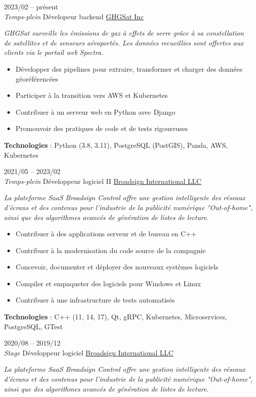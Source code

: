 \documentclass[9pt]{developercv2} %
\begin{document}
\begin{entrylist}
	\entry
	{2023/02 -- présent\\\emph{Temps-plein}}
	{Dévelopeur backend}
	{\href{https://ghgsat.com/fr/}{GHGSat Inc}}
	{
		\emph{
			GHGSat surveille les émissions de gaz à effets de serre grâce à sa constellation de satellites et de
			senseurs aéroportés. Les données recueillies sont offertes aux clients via le portail web Spectra.
		}

		\begin{itemize}
			\renewcommand{\labelitemi}{\raisebox{.45ex}{\rule{.6ex}{.6ex}}}
			\setlength\itemsep{-1pt}
			\item Développer des pipelines pour extraire, transformer et charger des données géoréférencées
			\item Participer à la transition vers AWS et Kubernetes
			\item Contribuer à un serveur web en Python avec Django
			\item Promouvoir des pratiques de code et de tests rigoureuses
		\end{itemize}

		\textbf{Technologies} : Python (3.8, 3.11), PostgreSQL (PostGIS), Panda, AWS, Kubernetes
	}
	\entry
	{2021/05 -- 2023/02\\\emph{Temps-plein}}
	{Développeur logiciel II}
	{\href{https://broadsign.com/}{Broadsign International LLC}}
	{
		\emph{
			La plateforme SaaS Broadsign Control offre une gestion intelligente des réseaux d'écrans et des contenus
			pour l'industrie de la publicité numérique "Out-of-home", ainsi que des algorithmes avancés de génération de
			listes de lecture.
		}

		\begin{itemize}
			\renewcommand{\labelitemi}{\raisebox{.45ex}{\rule{.6ex}{.6ex}}}
			\setlength\itemsep{-1pt}
			\item Contribuer à des applications serveur et de bureau en C++
			\item Contribuer à la modernisation du code source de la compagnie
			\item Concevoir, documenter et déployer des nouveaux systèmes logiciels
			\item Compiler et empaqueter des logiciels pour Windows et Linux
			\item Contribuer à une infrastructure de tests automatisés
		\end{itemize}

		\textbf{Technologies} : C++ (11, 14, 17), Qt, gRPC, Kubernetes, Microservices, PostgreSQL, GTest
	}
	\entry
	{2020/08 -- 2019/12\\\emph{Stage}}
	{Développeur logiciel}
	{\href{https://broadsign.com/}{Broadsign International LLC}}
	{
		\emph{
			La plateforme SaaS Broadsign Control offre une gestion intelligente des réseaux d'écrans et des contenus
			pour l'industrie de la publicité numérique "Out-of-home", ainsi que des algorithmes avancés de génération de
			listes de lecture.
		}

}
\end{entrylist}
\end{document}
